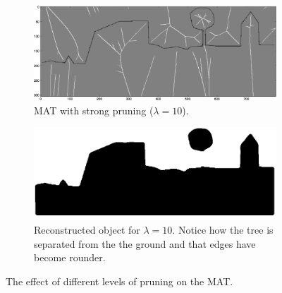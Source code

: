\begin{figure}
	\begin{subfigure}{0.4\linewidth}
		\includegraphics[width=\linewidth]{figs/rasterimpl/simple_dtm-gamma10_earthskel_.png}
		\caption{MAT with strong pruning ($\lambda=10$).}
		\label{fig:imaimp:e}
	\end{subfigure}
	\quad
	\begin{subfigure}{0.4\linewidth}
		\includegraphics[width=\linewidth]{figs/rasterimpl/simple_dtm-gamma10_earthskel.png}
		\caption{Reconstructed object for $\lambda=10$. Notice how the tree is separated from the the ground and that edges have become rounder.}
		\label{fig:imaimp:f}
	\end{subfigure}
	\caption{The effect of different levels of pruning on the MAT.}
	\label{fig:imaimp}
\end{figure}


